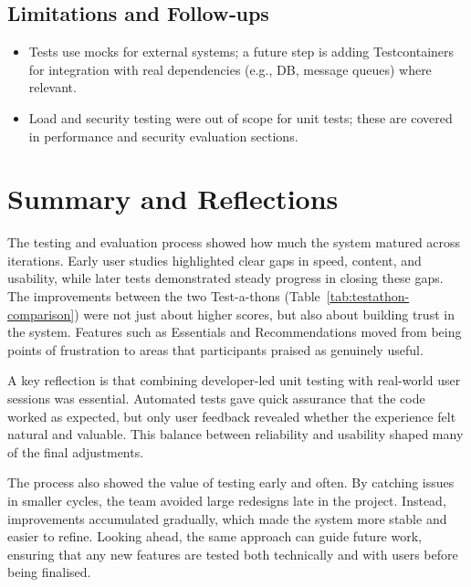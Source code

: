 \subsection{Limitations and Follow‑ups}
\begin{itemize} \itemsep0pt \parskip0pt
    \item Tests use mocks for external systems; a future step is adding Testcontainers for integration with real dependencies (e.g., DB, message queues) where relevant.
    \item Load and security testing were out of scope for unit tests; these are covered in performance and security evaluation sections.
\end{itemize}

\section{Summary and Reflections}

The testing and evaluation process showed how much the system matured across iterations. 
Early user studies highlighted clear gaps in speed, content, and usability, while later tests 
demonstrated steady progress in closing these gaps. The improvements between the two 
Test-a-thons (Table~\ref{tab:testathon-comparison}) were not just about higher scores, 
but also about building trust in the system. Features such as Essentials and Recommendations 
moved from being points of frustration to areas that participants praised as genuinely useful. 

A key reflection is that combining developer-led unit testing with real-world user sessions 
was essential. Automated tests gave quick assurance that the code worked as expected, 
but only user feedback revealed whether the experience felt natural and valuable. 
This balance between reliability and usability shaped many of the final adjustments. 

The process also showed the value of testing early and often. By catching issues in smaller 
cycles, the team avoided large redesigns late in the project. Instead, improvements 
accumulated gradually, which made the system more stable and easier to refine. 
Looking ahead, the same approach can guide future work, ensuring that any new 
features are tested both technically and with users before being finalised.

